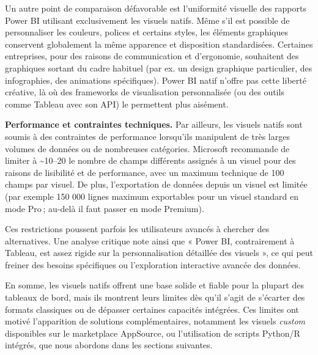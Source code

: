Un autre point de comparaison défavorable est l’uniformité visuelle des rapports Power BI utilisant exclusivement les visuels natifs. Même s’il est possible de personnaliser les couleurs, polices et certains styles, les éléments graphiques conservent globalement la même apparence et disposition standardisées. Certaines entreprises, pour des raisons de communication et d’ergonomie, souhaitent des graphiques sortant du cadre habituel (par ex. un design graphique particulier, des infographies, des animations spécifiques). Power BI natif n’offre pas cette liberté créative, là où des frameworks de visualisation personnalisée (ou des outils comme Tableau avec son API) le permettent plus aisément\parencite{FyndAcademyPBIvsTableau2024}.

\textbf{Performance et contraintes techniques.} Par ailleurs, les visuels natifs sont soumis à des contraintes de performance lorsqu’ils manipulent de très larges volumes de données ou de nombreuses catégories. Microsoft recommande de limiter à \textasciitilde10–20 le nombre de champs différents assignés à un visuel pour des raisons de lisibilité et de performance, avec un maximum technique de 100 champs par visuel\parencite{MicrosoftVisualLimits2024}. De plus, l’exportation de données depuis un visuel est limitée (par exemple 150 000 lignes maximum exportables pour un visuel standard en mode Pro ; au-delà il faut passer en mode Premium)\parencite{PowerBICommunityExportLimit2023}.

Ces restrictions poussent parfois les utilisateurs avancés à chercher des alternatives. Une analyse critique note ainsi que « Power BI, contrairement à Tableau, est assez rigide sur la personnalisation détaillée des visuels », ce qui peut freiner des besoins spécifiques ou l’exploration interactive avancée des données\parencite{FyndAcademyPBIvsTableau2024}.

En somme, les visuels natifs offrent une base solide et fiable pour la plupart des tableaux de bord, mais ils montrent leurs limites dès qu’il s’agit de s’écarter des formats classiques ou de dépasser certaines capacités intégrées. Ces limites ont motivé l’apparition de solutions complémentaires, notamment les visuels \textit{custom} disponibles sur le marketplace AppSource, ou l’utilisation de scripts Python/R intégrés, que nous abordons dans les sections suivantes.
